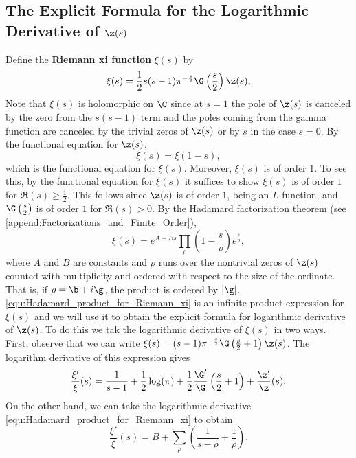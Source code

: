     \subsection*{The Explicit Formula for the Logarithmic Derivative of \texorpdfstring{$\z(s)$}{\z(s)}}
      Define the \textbf{Riemann xi function} $\xi(s)$ by
      \[
        \xi(s) = \frac{1}{2}s(s-1)\pi^{-\frac{s}{2}}\G\left(\frac{s}{2}\right)\z(s).
      \]
      Note that $\xi(s)$ is holomorphic on $\C$ since at $s = 1$ the pole of $\z(s)$ is canceled by the zero from the $s(s-1)$ term and the poles coming from the gamma function are canceled by the trivial zeros of $\z(s)$ or by $s$ in the case $s = 0$. By the functional equation for $\z(s)$,
      \[
        \xi(s) = \xi(1-s),
      \]
      which is the functional equation for $\xi(s)$. Moreover, $\xi(s)$ is of order $1$. To see this, by the functional equation for $\xi(s)$ it suffices to show $\xi(s)$ is of order $1$ for $\Re(s) \ge \frac{1}{2}$. This follows since $\z(s)$ is of order $1$, being an $L$-function, and $\G\left(\frac{s}{2}\right)$ is of order $1$ for $\Re(s) > 0$. By the Hadamard factorization theorem (see \cref{append:Factorizations_and_Finite_Order}),
      \begin{equation}\label{equ:Hadamard_product_for_Riemann_xi}
        \xi(s) = e^{A+Bs}\prod_{\rho}\left(1-\frac{s}{\rho}\right)e^{\frac{s}{\rho}},
      \end{equation}
      where $A$ and $B$ are constants and $\rho$ runs over the nontrivial zeros of $\z(s)$ counted with multiplicity and ordered with respect to the size of the ordinate. That is, if $\rho = \b+i\g$, the product is ordered by $|\g|$. \cref{equ:Hadamard_product_for_Riemann_xi} is an infinite product expression for $\xi(s)$ and we will use it to obtain the explicit formula for logarithmic derivative of $\z(s)$. To do this we tak the logarithmic derivative of $\xi(s)$ in two ways. First, observe that we can write $\xi(s) = (s-1)\pi^{-\frac{s}{2}}\G\left(\frac{s}{2}+1\right)\z(s)$. The logarithm derivative of this expression gives
      \begin{equation}\label{equ:logarithmic_derivative_Riemann_xi_1}
        \frac{\xi'}{\xi}(s) = \frac{1}{s-1}+\frac{1}{2}\log(\pi)+\frac{1}{2}\frac{\G'}{\G}\left(\frac{s}{2}+1\right)+\frac{\z'}{\z}(s).
      \end{equation}
      On the other hand, we can take the logarithmic derivative \cref{equ:Hadamard_product_for_Riemann_xi} to obtain
      \begin{equation}\label{equ:logarithmic_derivative_Riemann_xi_2}
        \frac{\xi'}{\xi}(s) = B+\sum_{\rho}\left(\frac{1}{s-\rho}+\frac{1}{\rho}\right).
      \end{equation}
